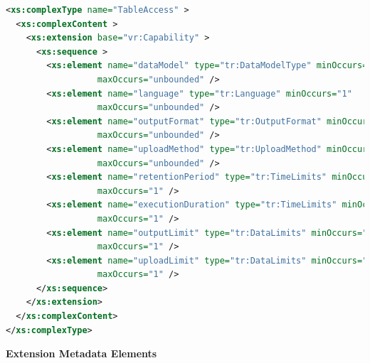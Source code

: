 \documentclass{ivoa}
\begin{document}
\begin{lstlisting}[language=XML,basicstyle=\footnotesize]
<xs:complexType name="TableAccess" >
  <xs:complexContent >
    <xs:extension base="vr:Capability" >
      <xs:sequence >
        <xs:element name="dataModel" type="tr:DataModelType" minOccurs="0"
                  maxOccurs="unbounded" />
        <xs:element name="language" type="tr:Language" minOccurs="1"
                  maxOccurs="unbounded" />
        <xs:element name="outputFormat" type="tr:OutputFormat" minOccurs="1"
                  maxOccurs="unbounded" />
        <xs:element name="uploadMethod" type="tr:UploadMethod" minOccurs="0"
                  maxOccurs="unbounded" />
        <xs:element name="retentionPeriod" type="tr:TimeLimits" minOccurs="0"
                  maxOccurs="1" />
        <xs:element name="executionDuration" type="tr:TimeLimits" minOccurs="0"
                  maxOccurs="1" />
        <xs:element name="outputLimit" type="tr:DataLimits" minOccurs="0"
                  maxOccurs="1" />
        <xs:element name="uploadLimit" type="tr:DataLimits" minOccurs="0"
                  maxOccurs="1" />
      </xs:sequence>
    </xs:extension>
  </xs:complexContent>
</xs:complexType>
\end{lstlisting}

\vspace{0.5ex}\noindent\textbf{ Extension Metadata Elements}
\end{document}
